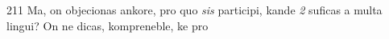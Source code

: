 \begin{VUpage}[215]{211}
Ma, on objecionas ankore, pro quo \textit{sis} participi, kande\nl
\textit{2} suficas a multa lingui? On ne dicas, kompreneble, ke pro\parplein
\end{VUpage}


